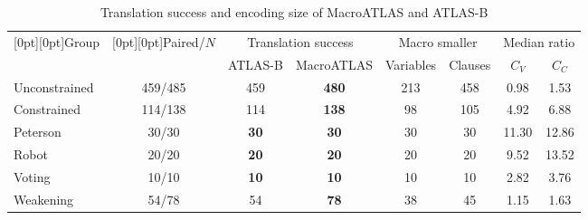 \begin{table}[!htbp]
\caption{Translation success and encoding size of MacroATLAS and ATLAS-B}
\label{tab:encoding}
\centering
\small
\setlength{\tabcolsep}{3pt}
\begin{tabular}{@{}lccccccc@{}}
\toprule
\raisebox{-1.6ex}[0pt][0pt]{Group} & \raisebox{-1.6ex}[0pt][0pt]{Paired/$N$} & \multicolumn{2}{c}{Translation success} & \multicolumn{2}{c}{Macro smaller} & \multicolumn{2}{c}{Median ratio} \\
\cmidrule(lr){3-4}\cmidrule(lr){5-6}\cmidrule(l){7-8}
& & ATLAS-B & MacroATLAS & Variables & Clauses & $C_V$ & $C_C$ \\
\midrule
Unconstrained & 459/485 & 459 & \textbf{480} & 213 & 458 & 0.98 & 1.53 \\
Constrained & 114/138 & 114 & \textbf{138} & 98 & 105 & 4.92 & 6.88 \\
\addlinespace[3pt]
\quad Peterson & 30/30 & \textbf{30} & \textbf{30} & 30 & 30 & 11.30 & 12.86 \\
\quad Robot & 20/20 & \textbf{20} & \textbf{20} & 20 & 20 & 9.52 & 13.52 \\
\quad Voting & 10/10 & \textbf{10} & \textbf{10} & 10 & 10 & 2.82 & 3.76 \\
\quad Weakening & 54/78 & 54 & \textbf{78} & 38 & 45 & 1.15 & 1.63 \\
\bottomrule
\end{tabular}
\end{table}
